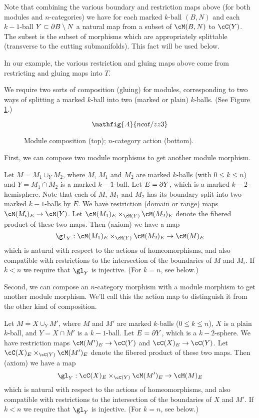 Note that combining the various boundary and restriction maps above
(for both modules and $n$-categories)
we have for each marked $k$-ball $(B, N)$ and each $k{-}1$-ball $Y\subset \partial B \setminus N$
a natural map from a subset of $\cM(B, N)$ to $\cC(Y)$.
The subset is the subset of morphisms which are appropriately splittable (transverse to the
cutting submanifolds).
This fact will be used below.

In our example, the various restriction and gluing maps above come from
restricting and gluing maps into $T$.

We require two sorts of composition (gluing) for modules, corresponding to two ways
of splitting a marked $k$-ball into two (marked or plain) $k$-balls.
(See Figure \ref{zzz3}.)

\begin{figure}[!ht]
\begin{equation*}
\mathfig{.4}{ncat/zz3}
\end{equation*}
\caption{Module composition (top); $n$-category action (bottom).}
\label{zzz3}
\end{figure}

First, we can compose two module morphisms to get another module morphism.

\begin{module-axiom}
{Let $M = M_1 \cup_Y M_2$, where $M$, $M_1$ and $M_2$ are marked $k$-balls (with $0\le k\le n$)
and $Y = M_1\cap M_2$ is a marked $k{-}1$-ball.
Let $E = \partial Y$, which is a marked $k{-}2$-hemisphere.
Note that each of $M$, $M_1$ and $M_2$ has its boundary split into two marked $k{-}1$-balls by $E$.
We have restriction (domain or range) maps $\cM(M_i)_E \to \cM(Y)$.
Let $\cM(M_1)_E \times_{\cM(Y)} \cM(M_2)_E$ denote the fibered product of these two maps. 
Then (axiom) we have a map
\[
	\gl_Y : \cM(M_1)_E \times_{\cM(Y)} \cM(M_2)_E \to \cM(M)_E
\]
which is natural with respect to the actions of homeomorphisms, and also compatible with restrictions
to the intersection of the boundaries of $M$ and $M_i$.
If $k < n$ we require that $\gl_Y$ is injective.
(For $k=n$, see below.)}
\end{module-axiom}


Second, we can compose an $n$-category morphism with a module morphism to get another
module morphism.
We'll call this the action map to distinguish it from the other kind of composition.

\begin{module-axiom}
{Let $M = X \cup_Y M'$, where $M$ and $M'$ are marked $k$-balls ($0\le k\le n$),
$X$ is a plain $k$-ball,
and $Y = X\cap M'$ is a $k{-}1$-ball.
Let $E = \partial Y$, which is a $k{-}2$-sphere.
We have restriction maps $\cM(M')_E \to \cC(Y)$ and $\cC(X)_E\to \cC(Y)$.
Let $\cC(X)_E \times_{\cC(Y)} \cM(M')_E$ denote the fibered product of these two maps. 
Then (axiom) we have a map
\[
	\gl_Y :\cC(X)_E \times_{\cC(Y)} \cM(M')_E \to \cM(M)_E
\]
which is natural with respect to the actions of homeomorphisms, and also compatible with restrictions
to the intersection of the boundaries of $X$ and $M'$.
If $k < n$ we require that $\gl_Y$ is injective.
(For $k=n$, see below.)}
\end{module-axiom}


